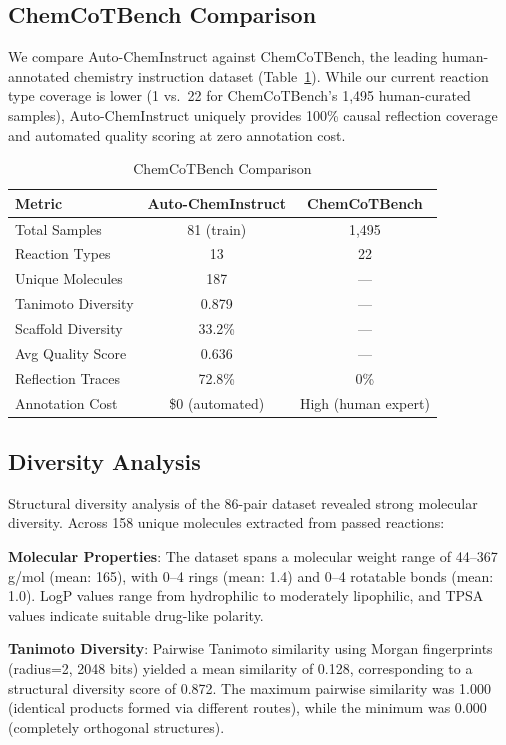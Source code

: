 \documentclass{article}
\begin{document}
\subsection{ChemCoTBench Comparison}
We compare Auto-ChemInstruct against ChemCoTBench, the leading human-annotated chemistry instruction dataset (Table~\ref{tab:chemcot}). While our current reaction type coverage is lower (1 vs.\ 22 for ChemCoTBench's 1,495 human-curated samples), Auto-ChemInstruct uniquely provides 100\% causal reflection coverage and automated quality scoring at zero annotation cost.

\begin{table}[h]
\centering
\caption{ChemCoTBench Comparison}
\label{tab:chemcot}
\begin{tabular}{lcc}
\toprule
\textbf{Metric} & \textbf{Auto-ChemInstruct} & \textbf{ChemCoTBench} \\
\midrule
Total Samples & 81 (train) & 1,495 \\
Reaction Types & 13 & 22 \\
Unique Molecules & 187 & — \\
Tanimoto Diversity & 0.879 & — \\
Scaffold Diversity & 33.2\% & — \\
Avg Quality Score & 0.636 & — \\
Reflection Traces & 72.8\% & 0\% \\
Annotation Cost & \$0 (automated) & High (human expert) \\
\bottomrule
\end{tabular}
\end{table}

\subsection{Diversity Analysis}
Structural diversity analysis of the 86-pair dataset revealed strong molecular diversity. Across 158 unique molecules extracted from passed reactions:

\textbf{Molecular Properties}: The dataset spans a molecular weight range of 44--367 g/mol (mean: 165), with 0--4 rings (mean: 1.4) and 0--4 rotatable bonds (mean: 1.0). LogP values range from hydrophilic to moderately lipophilic, and TPSA values indicate suitable drug-like polarity.

\textbf{Tanimoto Diversity}: Pairwise Tanimoto similarity using Morgan fingerprints (radius=2, 2048 bits) yielded a mean similarity of 0.128, corresponding to a structural diversity score of 0.872. The maximum pairwise similarity was 1.000 (identical products formed via different routes), while the minimum was 0.000 (completely orthogonal structures).
\end{document}
